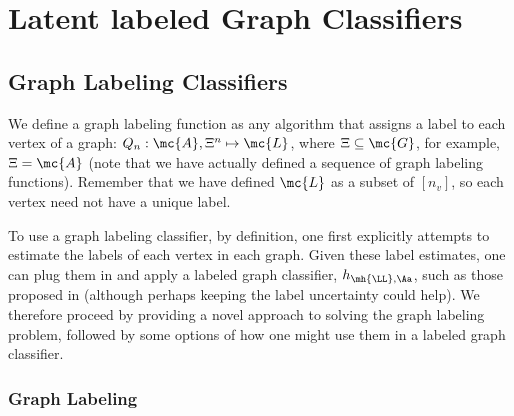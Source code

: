 \documentclass[10pt,journal,cspaper,compsoc]{IEEEtran}
\begin{document}


\section{Latent labeled Graph Classifiers} %
\label{sec:algs}

\subsection{Graph Labeling Classifiers} %
\label{sec:quadratic_assignment_problem}

We define a graph labeling function as any algorithm that assigns a label to each vertex of a graph: $Q_n: \mc{A}, \Xi^n \mapsto \mc{L}$, where $\Xi \subseteq \mc{G}$, for example, $\Xi=\mc{A}$ (note that we have actually defined a sequence of graph labeling functions).  Remember that we have defined $\mc{L}$ as a subset of $[n_v]$, so each vertex need not have a unique label.  

To use a graph labeling classifier, by definition, one first explicitly attempts to estimate the labels of each vertex in each graph.  Given these label estimates, one can plug them in and apply a labeled graph classifier, $h_{\mh{\LL},\Aa}$, such as those proposed in \cite{Vogelstein2011} (although perhaps keeping the label uncertainty could help).  We therefore proceed by providing a novel approach to solving the graph labeling problem, followed by some options of how one might use them in a labeled graph classifier.

\subsubsection{Graph Labeling} %
\label{ssub:graph_matching}
\end{document}
